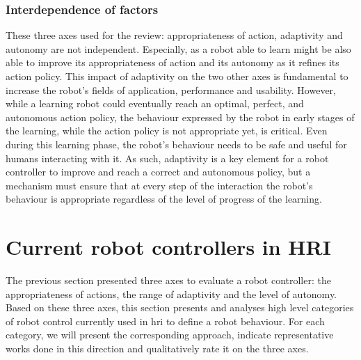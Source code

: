 
\subsubsection{Interdependence of factors}

	These three axes used for the review: appropriateness of action, adaptivity and autonomy are not independent. Especially, as a robot able to learn might be also able to improve its appropriateness of action and its autonomy as it refines its action policy. This impact of adaptivity on the two other axes is fundamental to increase the robot's fields of application, performance and usability. However, while a learning robot could eventually reach an optimal, perfect, and autonomous action policy, the behaviour expressed by the robot in early stages of the learning, while the action policy is not appropriate yet, is critical. Even during this learning phase, the robot's behaviour needs to be safe and useful for humans interacting with it. As such, adaptivity is a key element for a robot controller to improve and reach a correct and autonomous policy, but a mechanism must ensure that at every step of the interaction the robot's behaviour is appropriate regardless of the level of progress of the learning.

\section{Current robot controllers in HRI} \label{sec:back_behaviour}

    The previous section presented three axes to evaluate a robot controller: the appropriateness of actions, the range of adaptivity and the level of autonomy. Based on these three axes, this section presents and analyses high level categories of robot control currently used in \gls{hri} to define a robot behaviour. 
    For each category, we will present the corresponding approach, indicate representative works done in this direction and qualitatively rate it on the three axes.
	
